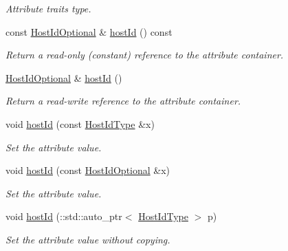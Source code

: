 \begin{DoxyCompactItemize}
\begin{DoxyCompactList}\small\item\em Attribute traits type. \item\end{DoxyCompactList}\item 
const \hyperlink{classopenstack_1_1xml_1_1Server_a036382a7e80c404d34a32cba3b71d494}{HostIdOptional} \& \hyperlink{classopenstack_1_1xml_1_1Server_aeea9a3b2928bbef0e1427b99d199c8ee}{hostId} () const 
\begin{DoxyCompactList}\small\item\em Return a read-\/only (constant) reference to the attribute container. \item\end{DoxyCompactList}\item 
\hyperlink{classopenstack_1_1xml_1_1Server_a036382a7e80c404d34a32cba3b71d494}{HostIdOptional} \& \hyperlink{classopenstack_1_1xml_1_1Server_af88a56b974a88e1d783e46143b380a54}{hostId} ()
\begin{DoxyCompactList}\small\item\em Return a read-\/write reference to the attribute container. \item\end{DoxyCompactList}\item 
void \hyperlink{classopenstack_1_1xml_1_1Server_a6f321ae79fe9d32744d049f6848d438b}{hostId} (const \hyperlink{classopenstack_1_1xml_1_1Server_a61b8af2381b0e56443bcaf2b29d55cee}{HostIdType} \&x)
\begin{DoxyCompactList}\small\item\em Set the attribute value. \item\end{DoxyCompactList}\item 
void \hyperlink{classopenstack_1_1xml_1_1Server_afae26883968d5fa475743c991995e00f}{hostId} (const \hyperlink{classopenstack_1_1xml_1_1Server_a036382a7e80c404d34a32cba3b71d494}{HostIdOptional} \&x)
\begin{DoxyCompactList}\small\item\em Set the attribute value. \item\end{DoxyCompactList}\item 
void \hyperlink{classopenstack_1_1xml_1_1Server_a698f1a8061dc01d1ea31d5a449476857}{hostId} (::std::auto\_\-ptr$<$ \hyperlink{classopenstack_1_1xml_1_1Server_a61b8af2381b0e56443bcaf2b29d55cee}{HostIdType} $>$ p)
\begin{DoxyCompactList}\small\item\em Set the attribute value without copying. \item\end{DoxyCompactList}\end{DoxyCompactItemize}
